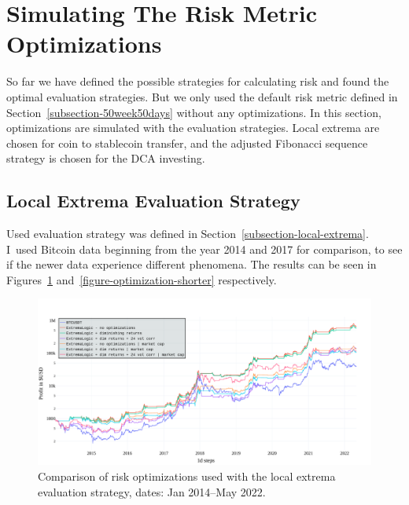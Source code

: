 \section{Simulating The Risk Metric Optimizations}
\label{section-sim-optimizations}
So far we have defined the possible strategies for calculating risk and found the optimal evaluation strategies. But we only used the default risk metric defined in Section~\ref{subsection-50week50days} without any optimizations. In this section, optimizations are simulated with the evaluation strategies. Local extrema are chosen for coin to stablecoin transfer, and the adjusted Fibonacci sequence strategy is chosen for the DCA investing.

\subsection*{Local Extrema Evaluation Strategy}
Used evaluation strategy was defined in Section~\ref{subsection-local-extrema}. I~used Bitcoin data beginning from the year 2014 and 2017 for comparison, to see if the newer data experience different phenomena. The results can be seen in Figures~\ref{figure-optimization-longer} and~\ref{figure-optimization-shorter} respectively.

\begin{figure}[!hbt]
    \centering
    \includegraphics[width=\columnwidth]{figures/evaluation-optimization-longer.pdf}
    \caption{Comparison of risk optimizations used with the local extrema evaluation strategy, dates: Jan 2014--May 2022.}
    \label{figure-optimization-longer}
\end{figure}

